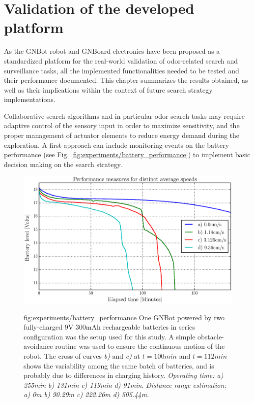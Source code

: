 \chapter{Validation of the developed platform}
\label{chap:experiments}
\vspace{-1cm}


As the GNBot robot and GNBoard electronics have been proposed as a standardized platform for the real-world validation of odor-related search and surveillance tasks, all the implemented functionalities needed to be tested and their performance documented.
This chapter summarizes the results obtained, as well as their implications within the context of future search strategy implementations.




\label{sect:batterylife}

Collaborative search algorithms and in particular odor search tasks may require adaptive control of the sensory input in order to maximize sensitivity, and the proper management of actuator elements to reduce energy demand during the exploration.
A first approach can include monitoring events on the battery performance (see Fig. \ref{fig:experiments/battery_performance}) to implement basic decision making on the search strategy.

\begin{figure}[h!]
\centerline{\mbox{\includegraphics[width=14cm]{images/experiments/battery_performance.eps}}}
{fig:experiments/battery_performance}{
One GNBot powered by two fully-charged 9V 300mAh rechargeable batteries in series configuration was the setup used for this study. A simple obstacle-avoidance routine was used to ensure the continuous motion of the robot.
The cross of curves \emph{b)} and \emph{c)} at $t=100min$ and $t=112min$ shows the variability among the same batch of batteries, and is probably due to differences in charging history.
\emph{Operating time: a) 255min b) 131min c) 119min d) 91min}.
\emph{Distance range estimation: a) 0m b) 90.29m c) 222.26m d) 505.44m}.
}
\end{figure}




